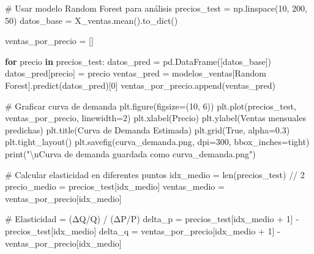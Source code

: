 \documentclass[
  doc,
  floatsintext,
  longtable,
  a4paper,
  nolmodern,
  notxfonts,
  notimes,
  12pt,
  colorlinks=true,linkcolor=blue,citecolor=blue,urlcolor=blue]{apa7}
\newenvironment{Shaded}{\begin{snugshade}}{\end{snugshade}}
\newcommand{\BuiltInTok}[1]{\textcolor[rgb]{0.00,0.23,0.31}{#1}}
\newcommand{\CharTok}[1]{\textcolor[rgb]{0.13,0.47,0.30}{#1}}
\newcommand{\CommentTok}[1]{\textcolor[rgb]{0.37,0.37,0.37}{#1}}
\newcommand{\ControlFlowTok}[1]{\textcolor[rgb]{0.00,0.23,0.31}{\textbf{#1}}}
\newcommand{\DecValTok}[1]{\textcolor[rgb]{0.68,0.00,0.00}{#1}}
\newcommand{\FloatTok}[1]{\textcolor[rgb]{0.68,0.00,0.00}{#1}}
\newcommand{\KeywordTok}[1]{\textcolor[rgb]{0.00,0.23,0.31}{\textbf{#1}}}
\newcommand{\NormalTok}[1]{\textcolor[rgb]{0.00,0.23,0.31}{#1}}
\newcommand{\OperatorTok}[1]{\textcolor[rgb]{0.37,0.37,0.37}{#1}}
\newcommand{\StringTok}[1]{\textcolor[rgb]{0.13,0.47,0.30}{#1}}
\newcommand{\VariableTok}[1]{\textcolor[rgb]{0.07,0.07,0.07}{#1}}
\begin{document}
\begin{Shaded}
\begin{Highlighting}[]
\CommentTok{\# Usar modelo Random Forest para análisis}
\NormalTok{precios\_test }\OperatorTok{=}\NormalTok{ np.linspace(}\DecValTok{10}\NormalTok{, }\DecValTok{200}\NormalTok{, }\DecValTok{50}\NormalTok{)}
\NormalTok{datos\_base }\OperatorTok{=}\NormalTok{ X\_ventas.mean().to\_dict()}

\NormalTok{ventas\_por\_precio }\OperatorTok{=}\NormalTok{ []}

\ControlFlowTok{for}\NormalTok{ precio }\KeywordTok{in}\NormalTok{ precios\_test:}
\NormalTok{    datos\_pred }\OperatorTok{=}\NormalTok{ pd.DataFrame([datos\_base])}
\NormalTok{    datos\_pred[}\StringTok{\textquotesingle{}precio\textquotesingle{}}\NormalTok{] }\OperatorTok{=}\NormalTok{ precio}
\NormalTok{    ventas\_pred }\OperatorTok{=}\NormalTok{ modelos\_ventas[}\StringTok{\textquotesingle{}Random Forest\textquotesingle{}}\NormalTok{].predict(datos\_pred)[}\DecValTok{0}\NormalTok{]}
\NormalTok{    ventas\_por\_precio.append(ventas\_pred)}

\CommentTok{\# Graficar curva de demanda}
\NormalTok{plt.figure(figsize}\OperatorTok{=}\NormalTok{(}\DecValTok{10}\NormalTok{, }\DecValTok{6}\NormalTok{))}
\NormalTok{plt.plot(precios\_test, ventas\_por\_precio, linewidth}\OperatorTok{=}\DecValTok{2}\NormalTok{)}
\NormalTok{plt.xlabel(}\StringTok{\textquotesingle{}Precio\textquotesingle{}}\NormalTok{)}
\NormalTok{plt.ylabel(}\StringTok{\textquotesingle{}Ventas mensuales predichas\textquotesingle{}}\NormalTok{)}
\NormalTok{plt.title(}\StringTok{\textquotesingle{}Curva de Demanda Estimada\textquotesingle{}}\NormalTok{)}
\NormalTok{plt.grid(}\VariableTok{True}\NormalTok{, alpha}\OperatorTok{=}\FloatTok{0.3}\NormalTok{)}
\NormalTok{plt.tight\_layout()}
\NormalTok{plt.savefig(}\StringTok{\textquotesingle{}curva\_demanda.png\textquotesingle{}}\NormalTok{, dpi}\OperatorTok{=}\DecValTok{300}\NormalTok{, bbox\_inches}\OperatorTok{=}\StringTok{\textquotesingle{}tight\textquotesingle{}}\NormalTok{)}
\BuiltInTok{print}\NormalTok{(}\StringTok{"}\CharTok{\textbackslash{}n}\StringTok{Curva de demanda guardada como \textquotesingle{}curva\_demanda.png\textquotesingle{}"}\NormalTok{)}

\CommentTok{\# Calcular elasticidad en diferentes puntos}
\NormalTok{idx\_medio }\OperatorTok{=} \BuiltInTok{len}\NormalTok{(precios\_test) }\OperatorTok{//} \DecValTok{2}
\NormalTok{precio\_medio }\OperatorTok{=}\NormalTok{ precios\_test[idx\_medio]}
\NormalTok{ventas\_medio }\OperatorTok{=}\NormalTok{ ventas\_por\_precio[idx\_medio]}

\CommentTok{\# Elasticidad = (ΔQ/Q) / (ΔP/P)}
\NormalTok{delta\_p }\OperatorTok{=}\NormalTok{ precios\_test[idx\_medio }\OperatorTok{+} \DecValTok{1}\NormalTok{] }\OperatorTok{{-}}\NormalTok{ precios\_test[idx\_medio]}
\NormalTok{delta\_q }\OperatorTok{=}\NormalTok{ ventas\_por\_precio[idx\_medio }\OperatorTok{+} \DecValTok{1}\NormalTok{] }\OperatorTok{{-}}\NormalTok{ ventas\_por\_precio[idx\_medio]}


\end{Highlighting}
\end{Shaded}
\end{document}
